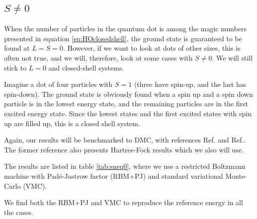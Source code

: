 \iffalse
\subsection{$S\neq0$}
When the number of particles in the quantum dot is among the magic numbers presented in equation \eqref{eq:HOclosedshell}, the ground state is guaranteed to be found at $L=S=0$. However, if we want to look at dots of other sizes, this is often not true, and we will, therefore, look at some cases with $S\neq 0$. We will still stick to $L=0$ and closed-shell systems.

Imagine a dot of four particles with $S=1$ (three have spin-up, and the last has spin-down). The ground state is obviously found when a spin up and a spin down particle is in the lowest energy state, and the remaining particles are in the first excited energy state. Since the lowest states and the first excited states with spin up are filled up, this is a closed shell system.

Again, our results will be benchmarked to DMC, with references Ref.\cite{pederiva_diffusion_2000} and Ref.\cite{ghosal_incipient_2007}. The former reference also presents Hartree-Fock results which we also will use. 

The results are listed in table \eqref{tab:sneq0}, where we use a restricted Boltzmann machine with Padé-Jastrow factor (RBM+PJ) and standard variational Monte-Carlo (VMC). 

We find both the RBM+PJ and VMC to reproduce the reference energy in all the cases. 

